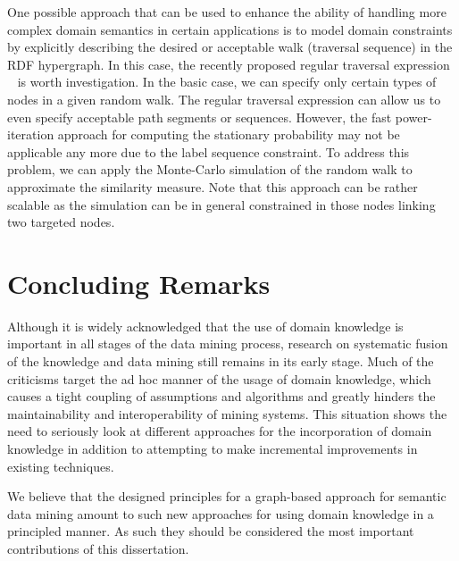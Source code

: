 One possible approach that can be used to enhance the ability of handling more complex domain semantics in certain applications is to model domain constraints by explicitly describing the desired or acceptable walk (traversal sequence) in the RDF hypergraph. In this case, the recently proposed regular traversal expression ~\cite{Marko10} is worth investigation. In the basic case, we can specify only certain types of nodes in a given random walk. The regular traversal expression can allow us to even specify acceptable path segments or sequences. However, the fast power-iteration approach for computing the stationary probability may not be applicable any more due to the label sequence constraint. To address this problem, we can apply the Monte-Carlo simulation of the random walk to approximate the similarity measure. Note that this approach can be rather scalable as the simulation can be in general constrained in those nodes linking two targeted nodes.

\section{Concluding Remarks}
Although it is widely acknowledged that the use of domain knowledge is important in all stages of the data mining process, research on systematic fusion of the knowledge and data mining still remains in its early stage. Much of the criticisms target the ad hoc manner of the usage of domain knowledge, which causes a tight coupling of assumptions and algorithms and greatly hinders the maintainability and interoperability of mining systems. This situation shows the need to seriously look at different approaches for the incorporation of domain knowledge in addition to attempting to make incremental improvements in existing techniques.

We believe that the designed principles for a graph-based approach for semantic data mining amount to such new approaches for using domain knowledge in a principled manner. As such they should be considered the most important contributions of this dissertation.